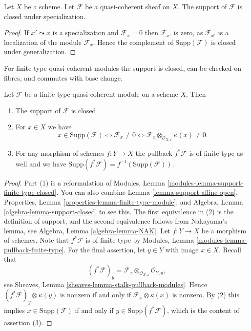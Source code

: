 \begin{lemma}
\label{lemma-support-closed-specialization}
Let $X$ be a scheme.
Let $\mathcal{F}$ be a quasi-coherent sheaf on $X$.
The support of $\mathcal{F}$ is closed under specialization.
\end{lemma}

\begin{proof}
If $x' \leadsto x$ is a specialization and $\mathcal{F}_x = 0$
then $\mathcal{F}_{x'}$ is zero, as $\mathcal{F}_{x'}$ is a localization
of the module $\mathcal{F}_x$. Hence the complement of
$\text{Supp}(\mathcal{F})$ is closed under generalization.
\end{proof}

\noindent
For finite type quasi-coherent modules the support is closed,
can be checked on fibres, and commutes with base change.

\begin{lemma}
\label{lemma-support-finite-type}
Let $\mathcal{F}$ be a finite type quasi-coherent module
on a scheme $X$. Then
\begin{enumerate}
\item The support of $\mathcal{F}$ is closed.
\item For $x \in X$ we have
$$
x \in \text{Supp}(\mathcal{F})
\Leftrightarrow
\mathcal{F}_x \not = 0
\Leftrightarrow
\mathcal{F}_x \otimes_{\mathcal{O}_{X, x}} \kappa(x) \not = 0.
$$
\item For any morphism of schemes $f : Y \to X$ the pullback
$f^*\mathcal{F}$ is of finite type as well and we have
$\text{Supp}(f^*\mathcal{F}) = f^{-1}(\text{Supp}(\mathcal{F}))$.
\end{enumerate}
\end{lemma}

\begin{proof}
Part (1) is a reformulation of
Modules, Lemma \ref{modules-lemma-support-finite-type-closed}.
You can also combine
Lemma \ref{lemma-support-affine-open},
Properties, Lemma \ref{properties-lemma-finite-type-module},
and
Algebra, Lemma \ref{algebra-lemma-support-closed}
to see this. The first equivalence in (2) is the definition
of support, and the second equivalence follows from
Nakayama's lemma, see
Algebra, Lemma \ref{algebra-lemma-NAK}.
Let $f : Y \to X$ be a morphism of schemes. Note that
$f^*\mathcal{F}$ is of finite type by
Modules, Lemma \ref{modules-lemma-pullback-finite-type}.
For the final assertion, let $y \in Y$ with image $x \in X$.
Recall that
$$
(f^*\mathcal{F})_y =
\mathcal{F}_x \otimes_{\mathcal{O}_{X, x}} \mathcal{O}_{Y, y},
$$
see
Sheaves, Lemma \ref{sheaves-lemma-stalk-pullback-modules}.
Hence $(f^*\mathcal{F})_y \otimes \kappa(y)$ is nonzero
if and only if $\mathcal{F}_x \otimes \kappa(x)$ is nonzero.
By (2) this implies $x \in \text{Supp}(\mathcal{F})$ if and only
if $y \in \text{Supp}(f^*\mathcal{F})$, which is the content of
assertion (3).
\end{proof}

